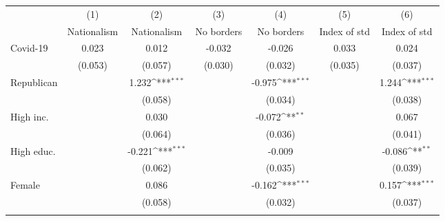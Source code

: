 {
\def\sym#1{\ifmmode^{#1}\else\(^{#1}\)\fi}
\begin{tabular}{l*{6}{c}}
\toprule
                    &\multicolumn{1}{c}{(1)}&\multicolumn{1}{c}{(2)}&\multicolumn{1}{c}{(3)}&\multicolumn{1}{c}{(4)}&\multicolumn{1}{c}{(5)}&\multicolumn{1}{c}{(6)}\\
                    &\multicolumn{1}{c}{Nationalism}&\multicolumn{1}{c}{Nationalism}&\multicolumn{1}{c}{No borders}&\multicolumn{1}{c}{No borders}&\multicolumn{1}{c}{Index of std}&\multicolumn{1}{c}{Index of std}\\
\midrule
Covid-19            &       0.023         &       0.012         &      -0.032         &      -0.026         &       0.033         &       0.024         \\
                    &     (0.053)         &     (0.057)         &     (0.030)         &     (0.032)         &     (0.035)         &     (0.037)         \\
\addlinespace
Republican          &                     &       1.232\sym{***}&                     &      -0.975\sym{***}&                     &       1.244\sym{***}\\
                    &                     &     (0.058)         &                     &     (0.034)         &                     &     (0.038)         \\
\addlinespace
High inc.           &                     &       0.030         &                     &      -0.072\sym{**} &                     &       0.067         \\
                    &                     &     (0.064)         &                     &     (0.036)         &                     &     (0.041)         \\
\addlinespace
High educ.          &                     &      -0.221\sym{***}&                     &      -0.009         &                     &      -0.086\sym{**} \\
                    &                     &     (0.062)         &                     &     (0.035)         &                     &     (0.039)         \\
\addlinespace
Female              &                     &       0.086         &                     &      -0.162\sym{***}&                     &       0.157\sym{***}\\
                    &                     &     (0.058)         &                     &     (0.032)         &                     &     (0.037)         \\
\addlinespace

\end{tabular}}
